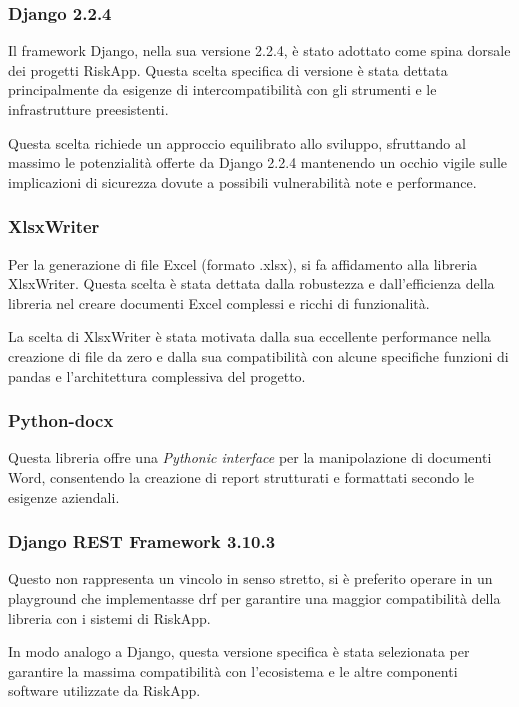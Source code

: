 		\subsubsection{Django 2.2.4}
		Il framework Django, nella sua versione 2.2.4, è stato adottato come spina dorsale dei progetti RiskApp. Questa scelta specifica di versione è stata dettata principalmente da esigenze di intercompatibilità con gli strumenti e le infrastrutture preesistenti.
		
		Questa scelta richiede un approccio equilibrato allo sviluppo, sfruttando al massimo le potenzialità offerte da Django 2.2.4 mantenendo un occhio vigile sulle implicazioni di sicurezza dovute a possibili vulnerabilità note e performance.
		
		\subsubsection{XlsxWriter}
		Per la generazione di file Excel (formato .xlsx), si fa affidamento alla libreria XlsxWriter. Questa scelta è stata dettata dalla robustezza e dall'efficienza della libreria nel creare documenti Excel complessi e ricchi di funzionalità.
		
		La scelta di XlsxWriter è stata motivata dalla sua eccellente performance nella creazione di file da zero e dalla sua compatibilità con alcune specifiche funzioni di \gls{pandas} e l'architettura complessiva del progetto.
		
		\subsubsection{Python-docx}
		Questa libreria offre una \textit{Pythonic interface} per la manipolazione di documenti Word, consentendo la creazione di report strutturati e formattati secondo le esigenze aziendali.
		
		\subsubsection{Django REST Framework 3.10.3}
		Questo non rappresenta un vincolo in senso stretto, si è preferito operare in un \gls{playground} che implementasse \gls{drf} per garantire una maggior compatibilità della libreria con i sistemi di RiskApp.
		
		In modo analogo a Django, questa versione specifica è stata selezionata per garantire la massima compatibilità con l'ecosistema e le altre componenti software utilizzate da RiskApp.

